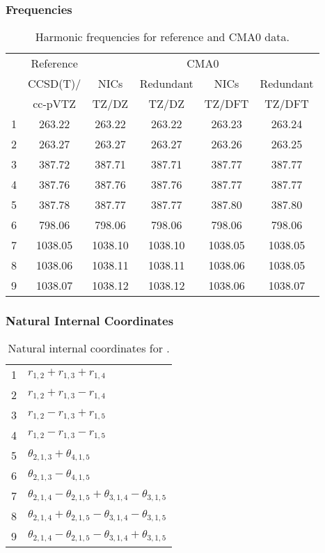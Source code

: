 \documentclass[10pt,oneside]{article}
\begin{document}
\begin{table}[h!]
\subsubsection*{Frequencies}
\centering
\caption{Harmonic frequencies for reference and CMA0 data.}
\begin{tabular}{cccccc}
\toprule
{} & Reference & \multicolumn{4}{c}{CMA0} \\
{} &  CCSD(T)/ &    NICs &  Redundant &    NICs & Redundant \\
{} &   cc-pVTZ &   TZ/DZ &      TZ/DZ &  TZ/DFT &    TZ/DFT \\
\midrule
1 &    263.22 &  263.22 &     263.22 &  263.23 &    263.24 \\
2 &    263.27 &  263.27 &     263.27 &  263.26 &    263.25 \\
3 &    387.72 &  387.71 &     387.71 &  387.77 &    387.77 \\
4 &    387.76 &  387.76 &     387.76 &  387.77 &    387.77 \\
5 &    387.78 &  387.77 &     387.77 &  387.80 &    387.80 \\
6 &    798.06 &  798.06 &     798.06 &  798.06 &    798.06 \\
7 &   1038.05 & 1038.10 &    1038.10 & 1038.05 &   1038.05 \\
8 &   1038.06 & 1038.11 &    1038.11 & 1038.06 &   1038.05 \\
9 &   1038.07 & 1038.12 &    1038.12 & 1038.06 &   1038.07 \\
\bottomrule
\end{tabular}
\end{table}

\begin{table}[h!]
\subsubsection*{Natural Internal Coordinates}
\centering
\caption{Natural internal coordinates for .}
\small
\begin{tabular}{ll}
\toprule
  1   & $r_{1,2} + r_{1,3} + r_{1,4}$ \\
  2   & $r_{1,2} + r_{1,3} - r_{1,4}$ \\
  3   & $r_{1,2} - r_{1,3} + r_{1,5}$ \\
  4   & $r_{1,2} - r_{1,3} - r_{1,5}$ \\
  5   & $\theta_{2,1,3} + \theta_{4,1,5}$ \\
  6   & $\theta_{2,1,3} - \theta_{4,1,5}$ \\
  7   & $\theta_{2,1,4} - \theta_{2,1,5} + \theta_{3,1,4} - \theta_{3,1,5}$ \\
  8   & $\theta_{2,1,4} + \theta_{2,1,5} - \theta_{3,1,4} - \theta_{3,1,5}$ \\
  9   & $\theta_{2,1,4} - \theta_{2,1,5} - \theta_{3,1,4} + \theta_{3,1,5}$ \\
\bottomrule
\end{tabular}
\end{table}
\end{document}
